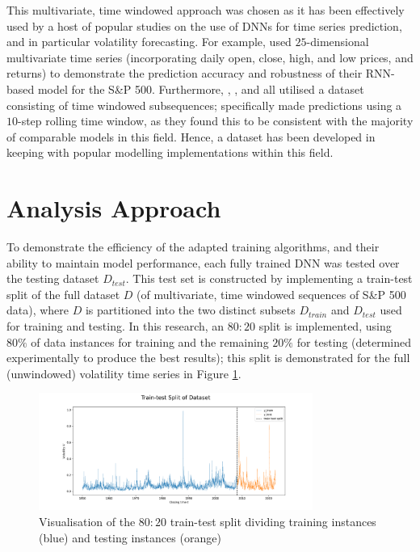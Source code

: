 \documentclass[a4paper, 11pt]{report}
\begin{document}
    This multivariate, time windowed approach was chosen as it has been effectively used by a host of popular studies on the use of DNNs for time series prediction, and in particular volatility forecasting. For example, \citet{xiong-2016} used $25$-dimensional multivariate time series (incorporating daily open, close, high, and low prices, and returns) to demonstrate the prediction accuracy and robustness of their RNN-based model for the S\&P 500. Furthermore, \citet{xiong-2016}, \citet{bucci-2020}, and \citet{rodikov-2022} all utilised a dataset consisting of time windowed subsequences; \citet{xiong-2016} specifically made predictions using a $10$-step rolling time window, as they found this to be consistent with the majority of comparable models in this field. Hence, a dataset has been developed in keeping with popular modelling implementations within this field.


    \section{Analysis Approach}
    \label{section: metrics}

    To demonstrate the efficiency of the adapted training algorithms, and their ability to maintain model performance, each fully trained DNN was tested over the testing dataset $D_{test}$. This test set is constructed by implementing a train-test split of the full dataset $D$ (of multivariate, time windowed sequences of S\&P 500 data), where $D$ is partitioned into the two distinct subsets $D_{train}$ and $D_{test}$ used for training and testing. In this research, an $80 \colon 20$ split is implemented, using $80\%$ of data instances for training and the remaining $20\%$ for testing (determined experimentally to produce the best results); this split is demonstrated for the full (unwindowed) volatility time series in Figure \ref{fig: traintest-split}.


    \begin{figure}[ht]
        \centering
        \includegraphics[width=0.8\textwidth]{traintest-split.png}
        \caption{\centering Visualisation of the $80 \colon 20$ train-test split dividing training instances (blue) and testing instances (orange)}
        \label{fig: traintest-split}
    \end{figure}
\end{document}
